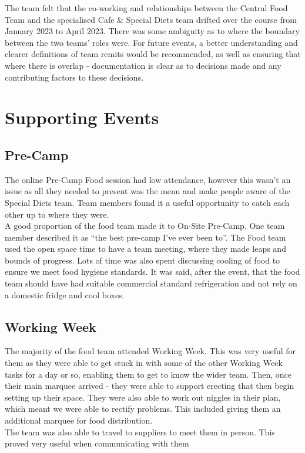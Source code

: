 The team felt that the co-working and relationships between the Central Food Team and the specialised Cafe \& Special Diets team drifted over the course from January 2023 to April 2023. There was some ambiguity as to where the boundary between the two teams' roles were. For future events, a better understanding and clearer definitions of team remits would be recommended, as well as ensuring that where there is overlap - documentation is clear as to decisions made and any contributing factors to these decisions. 
\section{Supporting Events}
\subsection{Pre-Camp}
The online Pre-Camp Food session had low attendance, however this wasn't an issue as all they needed to present was the menu and make people aware of the Special Diets team. Team members found it a useful opportunity to catch each other up to where they were.\\

A good proportion of the food team made it to On-Site Pre-Camp. One team member described it as ``the best pre-camp I've ever been to''. The Food team used the open space time to have a team meeting, where they made leaps and bounds of progress. Lots of time was also spent discussing cooling of food to ensure we meet food hygiene standards. It was said, after the event, that the food team should have had suitable commercial standard refrigeration and not rely on a domestic fridge and cool boxes.
\subsection{Working Week}
The majority of the food team attended Working Week. This was very useful for them as they were able to get stuck in with some of the other Working Week tasks for a day or so, enabling them to get to know the wider team. Then, once their main marquee arrived - they were able to support erecting that then begin setting up their space. They were also able to work out niggles in their plan, which meant we were able to rectify problems. This included giving them an additional marquee for food distribution. \\

The team was also able to travel to suppliers to meet them in person. This proved very useful when communicating with them

